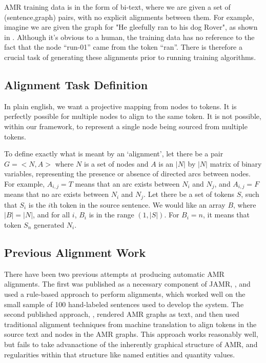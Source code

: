 

AMR training data is in the form of bi-text, where we are given a set of (sentence,graph) pairs, with no explicit alignments between them. For example, imagine we are given the graph for "He gleefully ran to his dog Rover", as shown in . Although it's obvious to a human, the training data has no reference to the fact that the node ``run-01'' came from the token ``ran''. There is therefore a crucial task of generating these alignments prior to running training algorithms.

\subsection{Alignment Task Definition}

In plain english, we want a projective mapping from nodes to tokens. It is perfectly possible for multiple nodes to align to the same token. It is not possible, within our framework, to represent a single node being sourced from multiple tokens.

To define exactly what is meant by an `alignment', let there be a pair $G = <N,A>$ where $N$ is a set of nodes and $A$ is an $|N|$ by $|N|$ matrix of binary variables, representing the presence or absence of directed arcs between nodes. For example, $A_{i,j} = T$ means that an arc exists between $N_i$ and $N_j$, and $A_{i,j} = F$ means that no arc exists between $N_i$ and $N_j$. Let there be a set of tokens $S$, such that $S_i$ is the $i$th token in the source sentence. We would like an array $B$, where $|B| = |N|$, and for all $i$, $B_i$ is in the range $(1,|S|)$. For $B_i = n$, it means that token $S_n$ generated $N_i$.

\subsection{Previous Alignment Work}

There have been two previous attempts at producing automatic AMR alignments. The first was published as a necessary component of JAMR, \cite{Flanigan:14}, and used a rule-based approach to perform alignments, which worked well on the small sample of 100 hand-labeled sentences used to develop the system. The second published approach, , rendered AMR graphs as text, and then used traditional alignment techniques from machine translation to align tokens in the source text and nodes in the AMR graphs. This approach works reasonably well, but fails to take advanactione of the inherently graphical structure of AMR, and regularities within that structure like named entities and quantity values.

